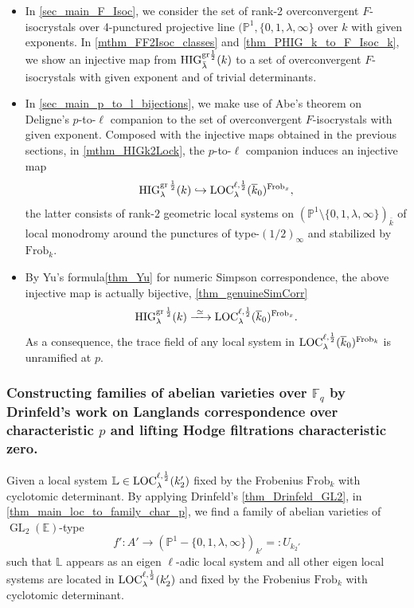 \documentclass[12pt,twoside]{book}
\theoremstyle{plain}
\theoremstyle{definition}
\theoremstyle{remark}
\newcommand{\bL}{{\mathbb L}}
\DeclareMathOperator\GL{GL}
\newcommand{\Fq}{{\mathbb{F}_q}}
\numberwithin{equation}{section}
\def\High{{\mathrm{HIG}^{{\rm gr}\,{1\over 2}}_{\lambda}}}
\def\Loch{{\mathrm{LOC}^{\ell,{1\over 2}}_{\lambda}}}
\def\Frob{\mathrm{Frob}}
\def\EK{{\mathbb E}}
\def\bark{{\overline k}_0}
\begin{document}
\begin{itemize}
\item In \autoref{sec_main_F_Isoc}, we consider the set of rank-2 overconvergent $F$-isocrystals over 4-punctured projective line $(\mathbb P^1, \{0,1,\lambda,\infty\}$ over $k$ with given exponents. In \autoref{mthm_FF2Isoc_classes} and \autoref{thm_PHIG_k_to_F_Isoc_k}, we show an injective map from
$\text{HIG}^{\text{gr} {1\over 2}}_{\bar \lambda}(k) $ to a set of overconvergent $F$-isocrystals with given exponent and of trivial determinants.
\item In \autoref{sec_main_p_to_l_bijections}, we make use of Abe's theorem on Deligne's $p$-to-$\ell$ companion to the set of overconvergent $F$-isocrystals with given exponent. Composed with the injective maps obtained in the previous sections, in \autoref{mthm_HIGk2Lock}, the $p$-to-$\ell$ companion induces an injective map
\[ \High(k) \hookrightarrow \Loch(\bark)^{\Frob_x},\]
the latter consists of rank-$2$ geometric local systems on $(\mathbb P^1\setminus \{0,1, \lambda, \infty\})_{\bar k}$ of local monodromy around the punctures of type-$(1/2)_\infty$ and stabilized by $\Frob_k$.
\item By Yu's formula\autoref{thm_Yu} for numeric Simpson correspondence, the above injective map is actually bijective, \autoref{thm_genuineSimCorr}
\begin{equation} \label{eq_bij_Hig_k_to_loc_bark}
\High(k) \xrightarrow{\ \simeq\ } \Loch(\bark)^{\Frob_x}.
\end{equation}
As a consequence, the trace field of any local system in $\Loch(\bark)^{\Frob_k}$ is unramified at $p$.
\end{itemize}

\subsubsection{\bf Constructing families of abelian varieties over $\Fq$ by Drinfeld's work on Langlands correspondence over characteristic $p$ and lifting Hodge filtrations characteristic zero.}

Given a local system $\bL\in \Loch(k_2')$ fixed by the Frobenius $\text{Frob}_k$ with cyclotomic determinant. By applying Drinfeld's \autoref{thm_Drinfeld_GL2}, in \autoref{thm_main_loc_to_family_char_p}, we find a family of abelian varieties of $\GL_2(\EK)$-type 
\[f'\colon A' \to (\mathbb P^1-\{0,1,\lambda,\infty\})_{k'}=:U_{k_2'}\]
such that $\bL$ appears as an eigen $\ell$-adic local system and all other eigen local systems are located in $\Loch(k_2')$ and fixed by the Frobenius $\text{Frob}_k$ with cyclotomic determinant.
\end{document}
